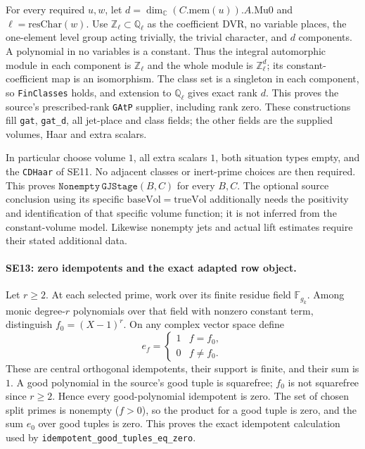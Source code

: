 For every required $u,w$, let
$d=\dim_{\mathbb C}(C.\mathrm{mem}(u)).A.\mathrm{Mu0}$ and
$\ell=\mathrm{resChar}(w)$. Use $\mathbb Z_\ell\subset\mathbb Q_\ell$
as the coefficient DVR, no variable places, the one-element level
group acting trivially, the trivial character, and $d$ components.
A polynomial in no variables is a constant. Thus the integral
automorphic module in each component is $\mathbb Z_\ell$ and the
whole module is $\mathbb Z_\ell^d$; its constant-coefficient map is
an isomorphism. The class set is a singleton in each component, so
\texttt{FinClasses} holds, and extension to $\mathbb Q_\ell$ gives
exact rank $d$. This proves the source's prescribed-rank
\texttt{GAtP} supplier, including rank zero. These constructions
fill \texttt{gat}, \texttt{gat\_d}, all jet-place and class fields;
the other fields are the supplied volumes, Haar and extra scalars.

In particular choose volume $1$, all extra scalars $1$, both situation
types empty, and the \texttt{CDHaar} of SE11. No adjacent classes or
inert-prime choices are then required. This proves
$\texttt{Nonempty}\,\texttt{GJStage}(B,C)$ for every $B,C$.
The optional source conclusion using its specific
$\mathrm{baseVol}=\mathrm{trueVol}$ additionally needs the positivity
and identification of that specific volume function; it is not
inferred from the constant-volume model. Likewise nonempty jets and
actual lift estimates require their stated additional data.

\paragraph{SE13: zero idempotents and the exact adapted row object.}
Let $r\ge2$. At each selected prime, work over its finite residue field
$\mathbb F_{g_k}$. Among monic degree-$r$ polynomials over that field
with nonzero constant term, distinguish $f_0=(X-1)^r$.
On any complex vector space define
\[
 e_f=\begin{cases}1&f=f_0,\\0&f\ne f_0.\end{cases}
 \tag{SE.18}
\]
These are central orthogonal idempotents, their support is finite,
and their sum is $1$. A good polynomial in the source's good tuple
is squarefree; $f_0$ is not squarefree since $r\ge2$. Hence every
good-polynomial idempotent is zero. The set of chosen split primes
is nonempty ($f>0$), so the product for a good tuple is zero, and
the sum $e_0$ over good tuples is zero. This proves the exact
idempotent calculation used by
\texttt{idempotent\_good\_tuples\_eq\_zero}.

